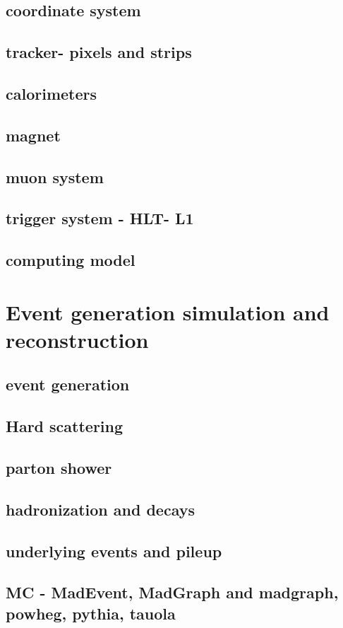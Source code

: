 \subsection{coordinate system }
\subsection{tracker- pixels and strips }
\subsection{calorimeters}
\subsection{magnet }
\subsection{muon system }
\subsection{trigger system - HLT- L1 }
\subsection{ computing model}
\section{Event generation  simulation and reconstruction}
\subsection{ event generation}
\subsection{Hard scattering  }
\subsection{parton shower }
\subsection{hadronization and decays }
\subsection{underlying events and pileup }
\subsection{ MC - MadEvent, MadGraph and madgraph\@NLO, powheg, pythia, tauola}
